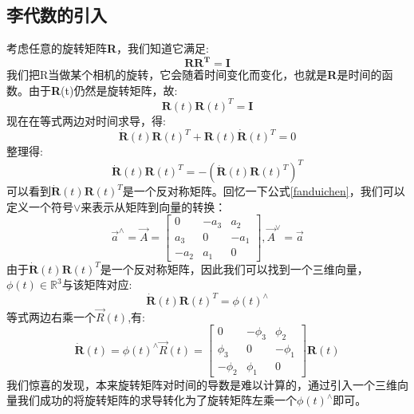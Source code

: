 \subsection{李代数的引入}
考虑任意的旋转矩阵\textbf{R}，我们知道它满足:
\begin{equation}
	\boldsymbol{RR^T}=\boldsymbol{I}
\end{equation}
我们把R当做某个相机的旋转，它会随着时间变化而变化，也就是\textbf{R}是时间的函数。由于\textbf{R}(t)仍然是旋转矩阵，故:
\begin{equation}
	\boldsymbol{R}(t)\boldsymbol{R}(t)^T=\boldsymbol{I}
\end{equation}
现在在等式两边对时间求导，得:
\begin{equation}
	\dot{\boldsymbol{R}}(t)\boldsymbol{R}(t)^T+\boldsymbol{R}(t)\dot{\boldsymbol{R}}(t)^T=0
\end{equation}
整理得:
\begin{equation}
\dot{\boldsymbol{R}}(t)\boldsymbol{R}(t)^T=-\left(\dot{\boldsymbol{R}}(t)\boldsymbol{R}(t)^T\right)^T
\end{equation}
可以看到$\dot{\boldsymbol{R}}(t)\boldsymbol{R}(t)^T$是一个反对称矩阵。回忆一下公式\ref{fanduichen}，我们可以定义一个符号$\vee$来表示从矩阵到向量的转换：
\begin{equation}
	\vec{a}^\wedge = \vec{A}=\begin{bmatrix}
	0 & -a_3 & a_2\\
	a_3& 0& -a_1\\
	-a_2& a_1& 0
	\end{bmatrix}, \vec{A}^\vee = \vec{a}
\end{equation}
由于$\dot{\boldsymbol{R}}(t)\boldsymbol{R}(t)^T$是一个反对称矩阵，因此我们可以找到一个三维向量，$\phi(t)\in \mathbb{R}^3$与该矩阵对应:
\begin{equation}
	\dot{\boldsymbol{R}}(t)\boldsymbol{R}(t)^T = \phi(t)^\wedge
\end{equation}
等式两边右乘一个$\vec{R}(t)$,有:
\begin{equation}
	\dot{\boldsymbol{R}}(t)=\phi(t)^\wedge \vec{R}(t)=\left[ \begin{array}{ccc}{0} & {-\phi_{3}} & {\phi_{2}} \\ {\phi_{3}} & {0} & {-\phi_{1}} \\ {-\phi_{2}} & {\phi_{1}} & {0}\end{array}\right] \boldsymbol{R}(t)\label{Rqiudao}
\end{equation}
我们惊喜的发现，本来旋转矩阵对时间的导数是难以计算的，通过引入一个三维向量我们成功的将旋转矩阵的求导转化为了旋转矩阵左乘一个$\phi(t)^\wedge$即可。\par
